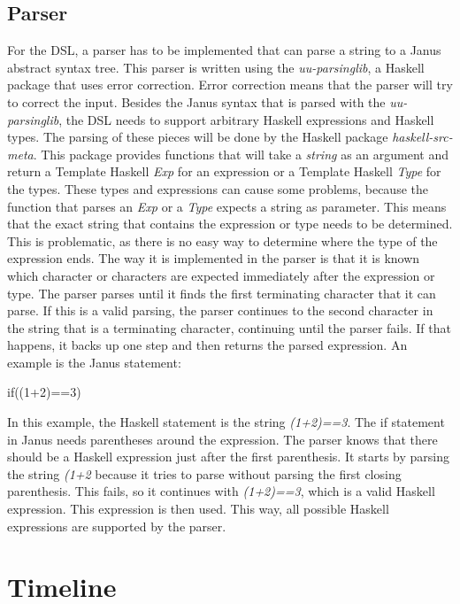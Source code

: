 \documentclass[12pt,a4paper]{article}
\begin{document}
\subsection{Parser}
For the DSL, a parser has to be implemented that can parse a string to a Janus abstract syntax tree. This parser is written using the \textit{uu-parsinglib}, a Haskell package that uses error correction. Error correction means that the parser will try to correct the input. Besides the Janus syntax that is parsed with the \textit{uu-parsinglib}, the DSL needs to support arbitrary Haskell expressions and Haskell types. The parsing of these pieces will be done by the Haskell package \textit{haskell-src-meta}. This package provides functions that will take a \textit{string} as an argument and return a Template Haskell \textit{Exp} for an expression or a Template Haskell \textit{Type} for the types. These types and expressions can cause some problems, because the function that parses an \textit{Exp} or a \textit{Type} expects a string as parameter. This means that the exact string that contains the expression or type needs to be determined. This is problematic, as there is no easy way to determine where the type of the expression ends. The way it is implemented in the parser is that it is known which character or characters are expected immediately after the expression or type. The parser parses until it finds the first terminating character that it can parse. If this is a valid parsing, the parser continues to the second character in the string that is a terminating character, continuing until the parser fails. If that happens, it backs up one step and then returns the parsed expression. An example is the Janus statement:
	\begin{displayquote}
		if((1+2)==3)
	\end{displayquote}
In this example, the Haskell statement is the string \textit{(1+2)==3}. The if statement in Janus needs parentheses around the expression. The parser knows that there should be a Haskell expression just after the first parenthesis. It starts by parsing the string \textit{(1+2} because it tries to parse without parsing the first closing parenthesis. This fails, so it continues with \textit{(1+2)==3}, which is a valid Haskell expression. This expression is then used. This way, all possible Haskell expressions are supported by the parser.

\section{Timeline}
\end{document}
